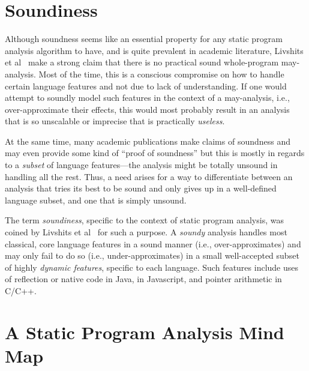 \section{Soundiness}
\label{sec:back:soundiness}

Although soundness seems like an essential property for any static program analysis algorithm to have, and is quite prevalent in academic literature, Livshits et al~\cite{article:2015:Livshits} make a strong claim that there is no practical sound whole-program may-analysis. Most of the time, this is a conscious compromise on how to handle certain language features and not due to lack of understanding. If one would attempt to soundly model such features in the context of a may-analysis, i.e., over-approximate their effects, this would most probably result in an analysis that is so unscalable or imprecise that is practically \emph{useless}.

At the same time, many academic publications make claims of soundness and may even provide some kind of ``proof of soundness'' but this is mostly in regards to a \emph{subset} of language features---the analysis might be totally unsound in handling all the rest. Thus, a need arises for a way to differentiate between an analysis that tries its best to be sound and only gives up in a well-defined language subset, and one that is simply unsound.

The term \emph{soundiness}, specific to the context of static program analysis, was coined by Livshits et al~\cite{article:2015:Livshits} for such a purpose. A \emph{soundy} analysis handles most classical, core language features in a sound manner (i.e., over-approximates) and may only fail to do so (i.e., under-approximates) in a small well-accepted subset of highly \emph{dynamic features}, specific to each language. Such features include uses of reflection or native code in Java,  in Javascript, and pointer arithmetic in C/C++.


\section{A Static Program Analysis Mind Map}

